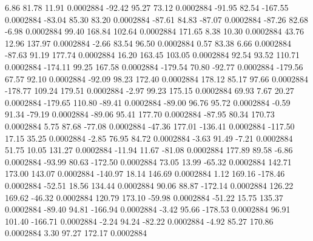         6.86       81.78       11.91     0.0002884
      -92.42       95.27       73.12     0.0002884
      -91.95       82.54     -167.55     0.0002884
      -83.04       85.30       83.20     0.0002884
      -87.61       84.83      -87.07     0.0002884
      -87.26       82.68       -6.98     0.0002884
       99.40      168.84      102.64     0.0002884
      171.65        8.38       10.30     0.0002884
       43.76       12.96      137.97     0.0002884
       -2.66       83.54       96.50     0.0002884
        0.57       83.38        6.66     0.0002884
      -87.63       91.19      177.74     0.0002884
       16.20      163.45      103.05     0.0002884
       92.54       93.52      110.71     0.0002884
     -174.11       99.25      167.58     0.0002884
     -179.54       70.80      -92.77     0.0002884
     -179.56       67.57       92.10     0.0002884
      -92.09       98.23      172.40     0.0002884
      178.12       85.17       97.66     0.0002884
     -178.77      109.24      179.51     0.0002884
       -2.97       99.23      175.15     0.0002884
       69.93        7.67       20.27     0.0002884
     -179.65      110.80      -89.41     0.0002884
      -89.00       96.76       95.72     0.0002884
       -0.59       91.34      -79.19     0.0002884
      -89.06       95.41      177.70     0.0002884
      -87.95       80.34      170.73     0.0002884
        5.75       87.68      -77.08     0.0002884
      -47.36      177.01     -136.41     0.0002884
     -117.50       17.15       35.25     0.0002884
       -2.85       76.95       84.72     0.0002884
       -3.63       91.49       -7.21     0.0002884
       51.75       10.05      131.27     0.0002884
      -11.94       11.67      -81.08     0.0002884
      177.89       89.58       -6.86     0.0002884
      -93.99       80.63     -172.50     0.0002884
       73.05       13.99      -65.32     0.0002884
      142.71      173.00      143.07     0.0002884
     -140.97       18.14      146.69     0.0002884
        1.12      169.16     -178.46     0.0002884
      -52.51       18.56      134.44     0.0002884
       90.06       88.87     -172.14     0.0002884
      126.22      169.62      -46.32     0.0002884
      120.79      173.10      -59.98     0.0002884
      -51.22       15.75      135.37     0.0002884
      -89.40       94.81     -166.94     0.0002884
       -3.42       95.66     -178.53     0.0002884
       96.91      101.40     -166.71     0.0002884
       -2.24       94.24      -82.22     0.0002884
       -4.92       85.27      170.86     0.0002884
        3.30       97.27      172.17     0.0002884
